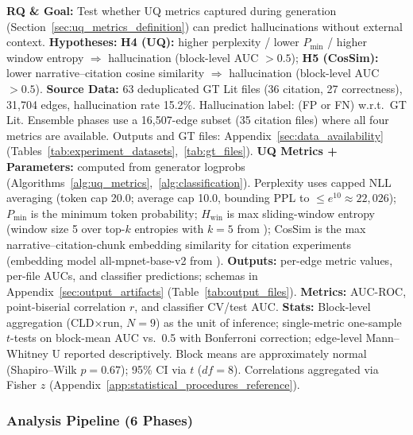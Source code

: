 \noindent\textbf{RQ \& Goal:} Test whether UQ metrics captured during generation (Section~\ref{sec:uq_metrics_definition}) can predict hallucinations without external context. \textbf{Hypotheses:} \textbf{H4 (UQ):} higher perplexity / lower $P_{\min}$ / higher window entropy $\Rightarrow$ hallucination (block-level AUC $>0.5$); \textbf{H5 (CosSim):} lower narrative--citation cosine similarity $\Rightarrow$ hallucination (block-level AUC $>0.5$). \textbf{Source Data:} 63 deduplicated GT Lit files (36 citation, 27 correctness), 31{,}704 edges, hallucination rate 15.2\%. Hallucination label: (FP or FN) w.r.t.\ GT Lit. Ensemble phases use a 16{,}507-edge subset (35 citation files) where all four metrics are available. Outputs and GT files: Appendix~\ref{sec:data_availability} (Tables~\ref{tab:experiment_datasets},~\ref{tab:gt_files}). \textbf{UQ Metrics + Parameters:} computed from generator logprobs (Algorithms~\ref{alg:uq_metrics},~\ref{alg:classification}). Perplexity uses capped NLL averaging (token cap 20.0; average cap 10.0, bounding PPL to $\le e^{10}\approx22{,}026$); $P_{\min}$ is the minimum token probability; $H_{\text{win}}$ is max sliding-window entropy (window size 5 over top-$k$ entropies with $k{=}5$ from \cite{openai2024api}); CosSim is the max narrative--citation-chunk embedding similarity for citation experiments (embedding model all-mpnet-base-v2 from \cite{muennighoff2023mteb}). \textbf{Outputs:} per-edge metric values, per-file AUCs, and classifier predictions; schemas in Appendix~\ref{sec:output_artifacts} (Table~\ref{tab:output_files}). \textbf{Metrics:} AUC-ROC, point-biserial correlation $r$, and classifier CV/test AUC. \textbf{Stats:} Block-level aggregation (CLD$\times$run, $N{=}9$) as the unit of inference; single-metric one-sample $t$-tests on block-mean AUC vs.\ 0.5 with Bonferroni correction; edge-level Mann--Whitney U reported descriptively. Block means are approximately normal (Shapiro--Wilk $p{=}0.67$); 95\% CI via $t$ ($df{=}8$). Correlations aggregated via Fisher $z$ (Appendix~\ref{app:statistical_procedures_reference}).

\subsubsection{Analysis Pipeline (6 Phases)}
\label{sec:rq2_analysis}

